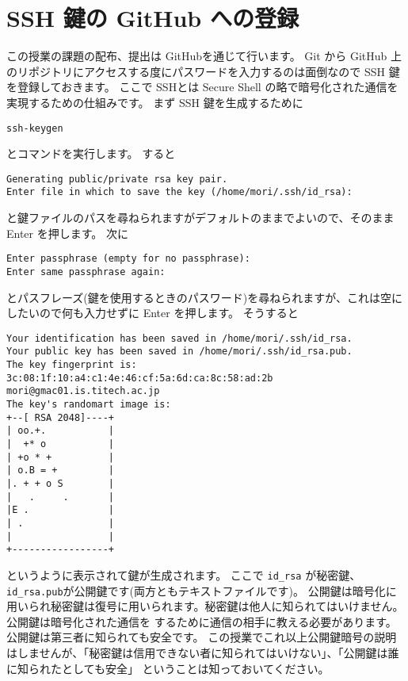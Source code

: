 \documentclass[a4paper]{article}
\begin{document}
\section{SSH 鍵の GitHub への登録}
この授業の課題の配布、提出は GitHubを通じて行います。
Git から GitHub 上のリポジトリにアクセスする度にパスワードを入力するのは面倒なので SSH 鍵を登録しておきます。
ここで SSHとは Secure Shell の略で暗号化された通信を実現するための仕組みです。
まず SSH 鍵を生成するために
\begin{verbatim}
ssh-keygen
\end{verbatim}
とコマンドを実行します。
すると
\begin{verbatim}
Generating public/private rsa key pair.
Enter file in which to save the key (/home/mori/.ssh/id_rsa): 
\end{verbatim}
と鍵ファイルのパスを尋ねられますがデフォルトのままでよいので、そのまま Enter を押します。
次に
\begin{verbatim}
Enter passphrase (empty for no passphrase): 
Enter same passphrase again: 
\end{verbatim}
とパスフレーズ(鍵を使用するときのパスワード)を尋ねられますが、これは空にしたいので何も入力せずに Enter を押します。
そうすると
\begin{verbatim}
Your identification has been saved in /home/mori/.ssh/id_rsa.
Your public key has been saved in /home/mori/.ssh/id_rsa.pub.
The key fingerprint is:
3c:08:1f:10:a4:c1:4e:46:cf:5a:6d:ca:8c:58:ad:2b mori@gmac01.is.titech.ac.jp
The key's randomart image is:
+--[ RSA 2048]----+
| oo.+.           |
|  +* o           |
| +o * +          |
| o.B = +         |
|. + + o S        |
|   .     .       |
|E .              |
| .               |
|                 |
+-----------------+
\end{verbatim}
というように表示されて鍵が生成されます。
ここで \texttt{id\_rsa} が秘密鍵、\texttt{id\_rsa.pub}が公開鍵です(両方ともテキストファイルです)。
公開鍵は暗号化に用いられ秘密鍵は復号に用いられます。秘密鍵は他人に知られてはいけません。公開鍵は暗号化された通信を
するために通信の相手に教える必要があります。公開鍵は第三者に知られても安全です。
この授業でこれ以上公開鍵暗号の説明はしませんが、「秘密鍵は信用できない者に知られてはいけない」、「公開鍵は誰に知られたとしても安全」
ということは知っておいてください。
\end{document}
